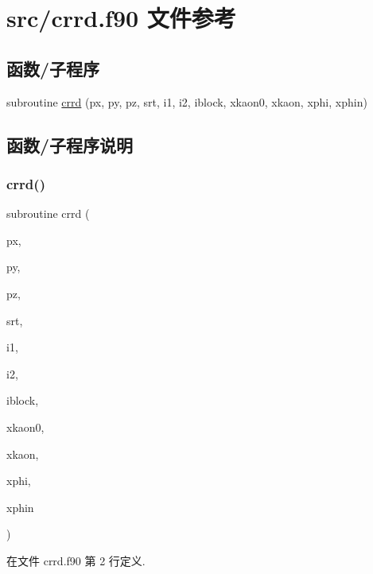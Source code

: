 \hypertarget{crrd_8f90}{}\section{src/crrd.f90 文件参考}
\label{crrd_8f90}
\subsection*{函数/子程序}
\begin{DoxyCompactItemize}
\item 
subroutine \mbox{\hyperlink{crrd_8f90_ae95f678f16fd44590caca4e45695f820}{crrd}} (px, py, pz, srt, i1, i2, iblock, xkaon0, xkaon, xphi, xphin)
\end{DoxyCompactItemize}


\subsection{函数/子程序说明}
\mbox{\label{crrd_8f90_ae95f678f16fd44590caca4e45695f820}} 
\subsubsection{\texorpdfstring{crrd()}{crrd()}}
{\footnotesize\ttfamily subroutine crrd (\begin{DoxyParamCaption}\item[{}]{px,  }\item[{}]{py,  }\item[{}]{pz,  }\item[{}]{srt,  }\item[{}]{i1,  }\item[{}]{i2,  }\item[{}]{iblock,  }\item[{}]{xkaon0,  }\item[{}]{xkaon,  }\item[{}]{xphi,  }\item[{}]{xphin }\end{DoxyParamCaption})}



在文件 crrd.\+f90 第 2 行定义.

